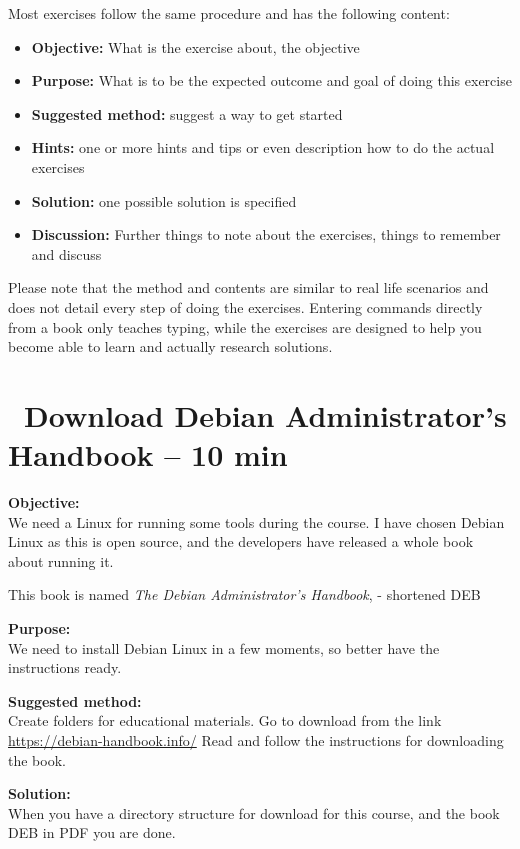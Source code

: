 \documentclass[a4paper,11pt,notitlepage]{report}
\begin{document}
Most exercises follow the same procedure and has the following content:
\begin{itemize}
\item {\bf Objective:} What is the exercise about, the objective
\item {\bf Purpose:} What is to be the expected outcome and goal of doing this exercise
\item {\bf Suggested method:} suggest a way to get started
\item {\bf Hints:} one or more hints and tips or even description how to
do the actual exercises
\item {\bf Solution:} one possible solution is specified
\item {\bf Discussion:} Further things to note about the exercises, things to remember and discuss
\end{itemize}

Please note that the method and contents are similar to real life scenarios and does not detail every step of doing the exercises. Entering commands directly from a book only teaches typing, while the exercises are designed to help you become able to learn and actually research solutions.


\chapter{\faExclamationTriangle\ Download Debian Administrator’s Handbook -- 10 min}
\label{ex:sw-downloadDEB}



{\bf Objective:}\\
We need a Linux for running some tools during the course. I have chosen Debian Linux as this is open source, and the developers have released a whole book about running it.

This book is named
\emph{The Debian Administrator’s Handbook},  - shortened DEB

{\bf Purpose:}\\
We need to install Debian Linux in a few moments, so better have the instructions ready.

{\bf Suggested method:}\\
Create folders for educational materials. Go to download from the link \url{https://debian-handbook.info/}
Read and follow the instructions for downloading the book.

{\bf Solution:}\\
When you have a directory structure for download for this course, and the book DEB in PDF you are done.
\end{document}
